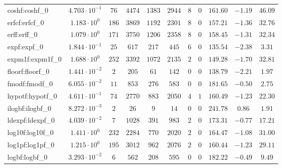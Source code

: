 \begin{tabular}{|l|c|c|c|c|c|c|c|c|c|c|}
coshf:coshf\_0               & $ 4.703 \cdot 10^{-1} $ & $ 76     $ & $ 4474  $ & $ 1383  $ & $ 2944  $ & $ 8   $ & $ 0 $ & $ 161.60      $ & $ -1.19   $ & $ 46.09   $ \\
erfcf:erfcf\_0               & $ 1.183 \cdot 10^{0}  $ & $ 186    $ & $ 3869  $ & $ 1192  $ & $ 2301  $ & $ 8   $ & $ 0 $ & $ 157.21      $ & $ -1.36   $ & $ 32.76   $ \\
erff:erff\_0                 & $ 1.079 \cdot 10^{0}  $ & $ 171    $ & $ 3750  $ & $ 1206  $ & $ 2358  $ & $ 8   $ & $ 0 $ & $ 158.45      $ & $ -1.31   $ & $ 32.34   $ \\
expf:expf\_0                 & $ 1.844 \cdot 10^{-1} $ & $ 25     $ & $ 617   $ & $ 217   $ & $ 445   $ & $ 6   $ & $ 0 $ & $ 135.54      $ & $ -2.38   $ & $ 3.31    $ \\
expm1f:expm1f\_0             & $ 1.688 \cdot 10^{0}  $ & $ 252    $ & $ 3392  $ & $ 1072  $ & $ 2135  $ & $ 2   $ & $ 0 $ & $ 149.28      $ & $ -1.70   $ & $ 32.81   $ \\
floorf:floorf\_0             & $ 1.441 \cdot 10^{-2} $ & $ 2      $ & $ 205   $ & $ 61    $ & $ 142   $ & $ 0   $ & $ 0 $ & $ 138.79      $ & $ -2.21   $ & $ 1.97    $ \\
fmodf:fmodf\_0               & $ 6.055 \cdot 10^{-2} $ & $ 11     $ & $ 853   $ & $ 276   $ & $ 583   $ & $ 0   $ & $ 0 $ & $ 181.65      $ & $ -0.50   $ & $ 2.75    $ \\
hypotf:hypotf\_0             & $ 4.611 \cdot 10^{-1} $ & $ 74     $ & $ 2770  $ & $ 883   $ & $ 2050  $ & $ 4   $ & $ 1 $ & $ 160.49      $ & $ -1.23   $ & $ 22.30   $ \\
ilogbf:ilogbf\_0             & $ 8.272 \cdot 10^{-3} $ & $ 2      $ & $ 26    $ & $ 9     $ & $ 14    $ & $ 0   $ & $ 0 $ & $ 241.78      $ & $ 0.86    $ & $ 1.91    $ \\
ldexpf:ldexpf\_0             & $ 4.039 \cdot 10^{-2} $ & $ 7      $ & $ 1028  $ & $ 391   $ & $ 983   $ & $ 2   $ & $ 0 $ & $ 173.31      $ & $ -0.77   $ & $ 17.21   $ \\
log10f:log10f\_0             & $ 1.411 \cdot 10^{0}  $ & $ 232    $ & $ 2284  $ & $ 770   $ & $ 2020  $ & $ 2   $ & $ 0 $ & $ 164.47      $ & $ -1.08   $ & $ 31.00   $ \\
log1pf:log1pf\_0             & $ 1.215 \cdot 10^{0}  $ & $ 195    $ & $ 3012  $ & $ 962   $ & $ 2076  $ & $ 2   $ & $ 0 $ & $ 160.44      $ & $ -1.23   $ & $ 29.11   $ \\
logbf:logbf\_0               & $ 3.293 \cdot 10^{-2} $ & $ 6      $ & $ 562   $ & $ 208   $ & $ 595   $ & $ 0   $ & $ 0 $ & $ 182.22      $ & $ -0.49   $ & $ 9.49    $ \\

\end{tabular}

